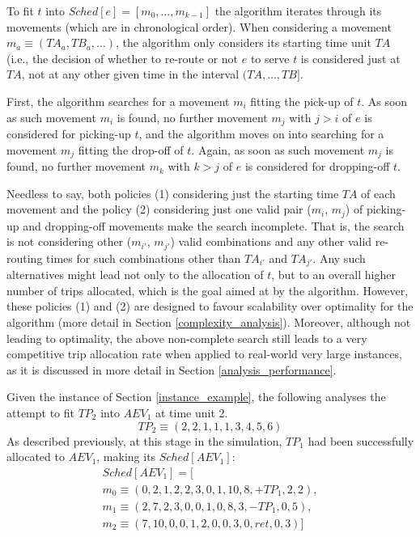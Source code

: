 To fit $t$ into $Sched[e] = [ m_0, \ldots, m_{k-1} ]$ 
the algorithm iterates through its movements (which are in chronological order).  When considering a movement 
$m_a \equiv (TA_a, TB_a,  ... )$, the algorithm only considers its starting time unit $TA$ (i.e., the decision of whether to re-route or not $e$ to serve $t$ is considered just at $TA$, not at any other given time in the 
interval $(TA,\ldots,TB]$.  

First, the algorithm searches for a movement $m_i$ fitting the pick-up of $t$.  As soon as such movement $m_i$ is found, no further movement $m_j$ with $j > i$ of $e$ is considered for picking-up $t$, and the algorithm moves on into searching for a movement $m_j$ fitting the drop-off of $t$.  Again, as soon as such movement $m_j$ is found, no further movement $m_k$ with $k > j$ of $e$ is considered for dropping-off $t$.  

Needless to say,  both policies (1) considering just the starting time $TA$ of each movement and the policy (2) considering just one valid pair ($m_{i}$, $m_{j}$) of picking-up and dropping-off movements make the search incomplete. That is, the search is not considering other ($m_{i'}$, $m_{j'}$) valid combinations and any other valid re-routing times for such combinations other than $TA_{i'}$ and $TA_{j'}$. Any such alternatives might lead not only to the allocation of $t$, but to an overall higher number of trips allocated, which is the goal aimed at by the algorithm. However, these policies (1) and (2) are designed to favour scalability over optimality for the algorithm (more detail in Section \ref{complexity_analysis}). 
Moreover, although not leading to optimality, the above non-complete search still leads to a very competitive trip allocation rate when applied to real-world very large instances, as it is discussed in more detail in Section \ref{analysis_performance}.  

Given the instance of Section \ref{instance_example}, the following analyses the attempt to fit $TP_2$ into $AEV_1$ at time unit 2.  
\[
TP_2 \equiv ( 2, 2, 1, 1, 1, 3, 4, 5, 6 )
\]
As described previously,  at this stage in the simulation,  $TP_1$ had been successfully allocated to $AEV_1$, making its $Sched[AEV_1]$:
\begin{align*}
Sched[AEV_1] = [\\ 
m_0 \equiv ( 0, 2, 1, 2, 2, 3, 0, 1, 10, 8, +TP_1, 2, 2 ),\\
m_1 \equiv ( 2, 7, 2, 3, 0, 0, 1, 0, 8, 3, -TP_1, 0, 5 ),\\
m_2 \equiv ( 7, 10, 0, 0, 1, 2, 0, 0, 3, 0, ret, 0, 3 )] 									 
\end{align*}	 

